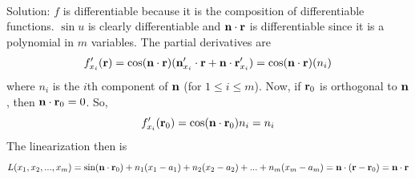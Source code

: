 \documentclass[12pt]{amsbook}
\begin{document}
\begin{enumerate}
\\
{\sc Solution}: $f$ is differentiable because it is the composition of differentiable functions. $\sin u$ is clearly differentiable and ${\bf n}\cdot{\bf r}$ is differentiable since it is a polynomial in $m$ variables. The partial derivatives are
\begin{eqnarray*}
f'_{x_i}({\bf r})=\cos({\bf n}\cdot {\bf r})({\bf n}'_{x_i}\cdot {\bf r}+{\bf n}\cdot{\bf r}'_{x_i})=\cos({\bf n}\cdot {\bf r})(n_i)
\end{eqnarray*}
where $n_i$ is the $i$th component of ${\bf n}$ (for $1 \leq i \leq m$). Now, if ${\bf r}_0$ is orthogonal to ${\bf n}$, then ${\bf n}\cdot{\bf r}_0=0$. So,
$$f'_{x_i}({\bf r}_0)=\cos({\bf n}\cdot{\bf r}_0)n_i=n_i$$
The linearization then is
$$L(x_1,x_2,...,x_m)=\sin({\bf n}\cdot{\bf r}_0)+n_1(x_1-a_1)+n_2(x_2-a_2)+...+n_m(x_m-a_m)={\bf n}\cdot({\bf r}-{\bf r}_0)={\bf n}\cdot{\bf r}$$
\end{enumerate}
\end{document}
